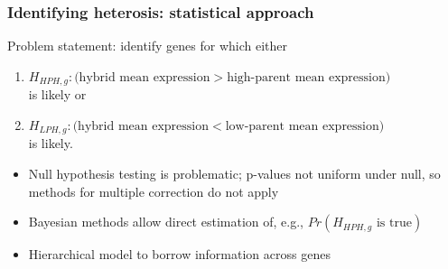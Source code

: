 \documentclass{beamer}
\begin{document}
\begin{frame}
\begin{columns}
    \begin{column}{.7\textwidth}
    \centering
    \end{column}
  \end{columns}
\end{frame}

\begin{frame}%
  \frametitle{Identifying heterosis: statistical approach}
  Problem statement: identify genes for which either
  {\small
  \begin{enumerate}
    \pause \item $H_{HPH,g}: (\mbox{hybrid mean expression} > \mbox{high-parent mean expression)}$\\ is likely \pause or
    \item $H_{LPH,g}: (\mbox{hybrid mean expression} < \mbox{low-parent mean expression)}$\\ is likely.
  \end{enumerate}
  }
  
  \begin{itemize}
    \pause \item Null hypothesis testing is problematic; p-values not uniform under null, so methods for multiple correction do not apply
    \pause \item Bayesian methods allow direct estimation of, e.g., $Pr(H_{HPH,g} \mbox{ is true})$
    \pause \item Hierarchical model to borrow information across genes
  \end{itemize}
\end{frame}
\end{document}
